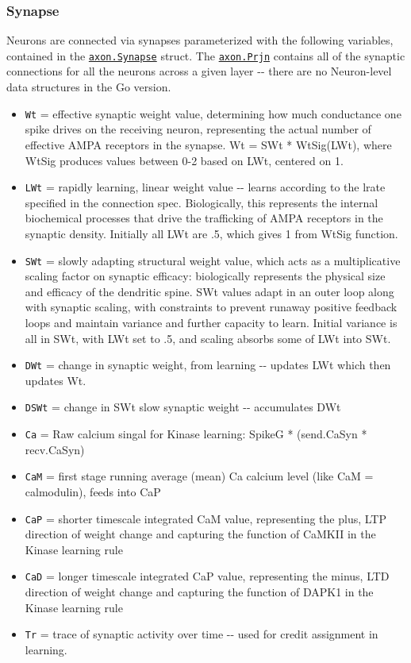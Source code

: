 \documentclass[11pt,twoside]{article}
\newif\myifpdf
\begin{document}
\hypertarget{synapse}{%
\subsubsection{Synapse}\label{synapse}}

Neurons are connected via synapses parameterized with the following
variables, contained in the
\href{https://github.com/emer/axon/blob/master/axon/synapse.go}{\texttt{axon.Synapse}}
struct. The
\href{https://github.com/emer/axon/blob/master/axon/prjn.go}{\texttt{axon.Prjn}}
contains all of the synaptic connections for all the neurons across a
given layer -\/- there are no Neuron-level data structures in the Go
version.

\begin{itemize}
\tightlist
\item
  \texttt{Wt} = effective synaptic weight value, determining how much
  conductance one spike drives on the receiving neuron, representing the
  actual number of effective AMPA receptors in the synapse. Wt = SWt *
  WtSig(LWt), where WtSig produces values between 0-2 based on LWt,
  centered on 1.
\item
  \texttt{LWt} = rapidly learning, linear weight value -\/- learns
  according to the lrate specified in the connection spec. Biologically,
  this represents the internal biochemical processes that drive the
  trafficking of AMPA receptors in the synaptic density. Initially all
  LWt are .5, which gives 1 from WtSig function.
\item
  \texttt{SWt} = slowly adapting structural weight value, which acts as
  a multiplicative scaling factor on synaptic efficacy: biologically
  represents the physical size and efficacy of the dendritic spine. SWt
  values adapt in an outer loop along with synaptic scaling, with
  constraints to prevent runaway positive feedback loops and maintain
  variance and further capacity to learn. Initial variance is all in
  SWt, with LWt set to .5, and scaling absorbs some of LWt into SWt.
\item
  \texttt{DWt} = change in synaptic weight, from learning -\/- updates
  LWt which then updates Wt.
\item
  \texttt{DSWt} = change in SWt slow synaptic weight -\/- accumulates
  DWt
\item
  \texttt{Ca} = Raw calcium singal for Kinase learning: SpikeG *
  (send.CaSyn * recv.CaSyn)
\item
  \texttt{CaM} = first stage running average (mean) Ca calcium level
  (like CaM = calmodulin), feeds into CaP
\item
  \texttt{CaP} = shorter timescale integrated CaM value, representing
  the plus, LTP direction of weight change and capturing the function of
  CaMKII in the Kinase learning rule
\item
  \texttt{CaD} = longer timescale integrated CaP value, representing the
  minus, LTD direction of weight change and capturing the function of
  DAPK1 in the Kinase learning rule
\item
  \texttt{Tr} = trace of synaptic activity over time -\/- used for
  credit assignment in learning.
\end{itemize}
\end{document}
